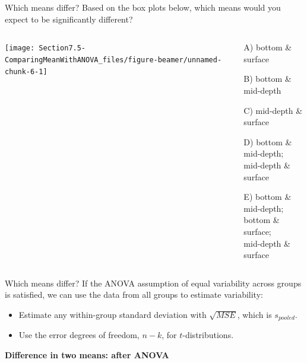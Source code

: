 \documentclass[
  ignorenonframetext,
]{beamer}
\begin{document}
\begin{frame}{Which means differ?}
\protect\hypertarget{which-means-differ-1}{}
\alert{Based on the box plots below, which means would you expect to be significantly different?}

\begin{columns}

\begin{column}{0.6\textwidth}


\begin{center}\texttt{[image: Section7.5-ComparingMeanWithANOVA\_files/figure-beamer/unnamed-chunk-6-1]} \end{center}

\end{column}

\begin{column}{0.35\textwidth}

\small
A) bottom \& surface

B) bottom \& mid-depth

C) mid-depth \& surface

D) bottom \& mid-depth; \\ mid-depth \& surface

E) bottom \& mid-depth; \\ bottom \& surface; \\ mid-depth \& surface

\end{column}

\end{columns}
\end{frame}

\begin{frame}{Which means differ?}
\protect\hypertarget{which-means-differ-2}{}
If the ANOVA assumption of equal variability across groups is satisfied,
we can use the data from all groups to estimate variability:

\begin{itemize}
\item
  Estimate any within-group standard deviation with \(\sqrt{MSE}\),
  which is \(s_{pooled}\).
\item
  Use the error degrees of freedom, \(n-k\), for \(t\)-distributions.
\end{itemize}

\textbf{Difference in two means: after ANOVA}

\end{frame}
\end{document}
